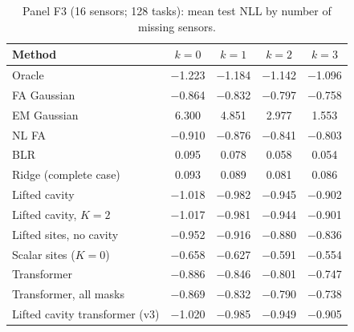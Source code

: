 \begin{table}[t]
\centering\small
\caption{\label{tab:moreF3}Panel F3 (16 sensors; 128 tasks): mean test NLL by number of missing sensors.}
\begin{tabular}{lcccc}
\toprule
Method & $k{=}0$ & $k{=}1$ & $k{=}2$ & $k{=}3$\\
\midrule
Oracle & $-$1.223 & $-$1.184 & $-$1.142 & $-$1.096\\
FA Gaussian & $-$0.864 & $-$0.832 & $-$0.797 & $-$0.758\\
EM Gaussian & 6.300 & 4.851 & 2.977 & 1.553\\
NL FA & $-$0.910 & $-$0.876 & $-$0.841 & $-$0.803\\
BLR & 0.095 & 0.078 & 0.058 & 0.054\\
Ridge (complete case) & 0.093 & 0.089 & 0.081 & 0.086\\
Lifted cavity & $-$1.018 & $-$0.982 & $-$0.945 & $-$0.902\\
Lifted cavity, $K=2$ & $-$1.017 & $-$0.981 & $-$0.944 & $-$0.901\\
Lifted sites, no cavity & $-$0.952 & $-$0.916 & $-$0.880 & $-$0.836\\
Scalar sites ($K=0$) & $-$0.658 & $-$0.627 & $-$0.591 & $-$0.554\\
Transformer & $-$0.886 & $-$0.846 & $-$0.801 & $-$0.747\\
Transformer, all masks & $-$0.869 & $-$0.832 & $-$0.790 & $-$0.738\\
Lifted cavity transformer (v3) & $-$1.020 & $-$0.985 & $-$0.949 & $-$0.905\\
\bottomrule
\end{tabular}
\end{table}

